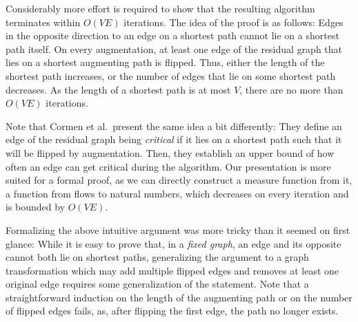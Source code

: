 \documentclass[smallcondensed]{svjour3}     %
\begin{document}
  Considerably more effort is required to show that the resulting algorithm terminates within $O(VE)$ iterations. 
  The idea of the proof is as follows: Edges in the opposite direction to an edge on a shortest path cannot lie 
  on a shortest path itself.
  On every augmentation, at least one edge of the residual graph that lies on a shortest augmenting path is flipped. Thus, either the length of the shortest path increases,
  or the number of edges that lie on some shortest path decreases. As the length of a shortest path is at most $V$, there are no more than $O(VE)$ iterations.
  
  Note that Cormen et al.~present the same idea a bit differently: They define an edge of the residual graph being \emph{critical} if it lies on a shortest path such that it will be flipped by augmentation. Then, they establish an upper bound of how often an edge can get critical during the algorithm. Our presentation is more suited for a formal proof, as we can directly construct a measure function from it, \ie a function from flows to natural numbers, which decreases on every iteration and is bounded by $O(VE)$. 
  
  Formalizing the above intuitive argument was more tricky than it seemed on first glance:
  While it is easy to prove that, in a \emph{fixed graph}, an edge and its opposite cannot both lie on shortest paths, generalizing the argument
  to a graph transformation which may add multiple flipped edges and removes at least one original edge requires some generalization of the statement.
  Note that a straightforward induction on the length of the augmenting path or on the number of flipped edges fails, as, after flipping the first 
  edge, the path no longer exists.
  
\end{document}
